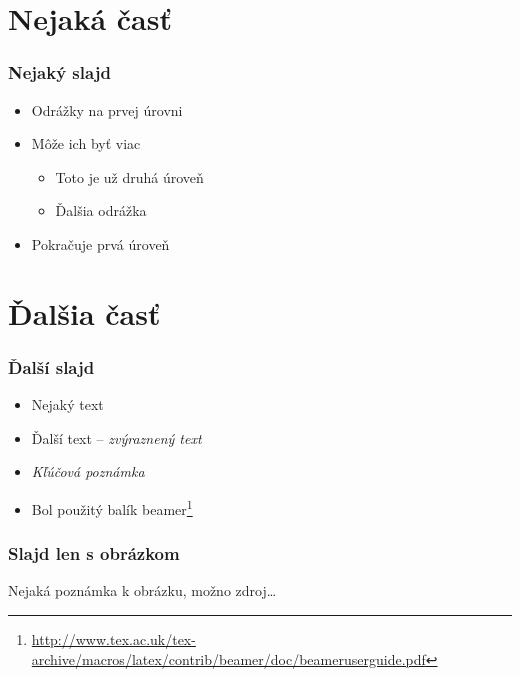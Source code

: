 \documentclass{beamer}
\newcommand{\footcite}[1]{\footnote{\tiny #1}}
\newcommand{\emp}[1]{\textit{\alert{#1}}}
\newcommand{\ssection}[1]{
	\section{#1}
	\begin{frame}[fragile=singleslide]\frametitle{}
	\Huge #1
	\end{frame}
}
\begin{document}
\section{Nejaká časť}

\begin{frame}[fragile=singleslide]\frametitle{Nejaký slajd}
	\begin{itemize}
		\item Odrážky na prvej úrovni
		\item Môže ich byť viac
		      \begin{itemize}
			      \item Toto je už druhá úroveň
			      \item Ďalšia odrážka
		      \end{itemize}
		\item Pokračuje prvá úroveň
	\end{itemize}
\end{frame}



\section{Ďalšia časť}

\begin{frame}[fragile=singleslide]\frametitle{Ďalší slajd}
	\begin{itemize}
		\item Nejaký text
		\item Ďalší text -- \emph{zvýraznený text}
		\item \emp{Kľúčová poznámka} %

		\item Bol použitý balík beamer\footcite{\url{http://www.tex.ac.uk/tex-archive/macros/latex/contrib/beamer/doc/beameruserguide.pdf}}
	\end{itemize}
\end{frame}


\begin{frame}[fragile=singleslide]\frametitle{Slajd len s obrázkom}

	{\tiny Nejaká poznámka k obrázku, možno zdroj\ldots}
\end{frame}
\end{document}
